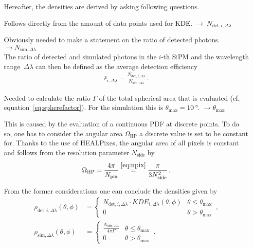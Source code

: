 Hereafter, the densities are derived by asking following questions.

Follows directly from the amount of data points used for KDE. $\rightarrow~N_{\text{det},i,\Delta\lambda}$

Obviously needed to make a statement on the ratio of detected photons. $\rightarrow N_{\text{sim},\Delta\lambda}$\\
The ratio of detected and simulated photons in the $i$-th SiPM and the wavelength range~$\Delta\lambda$ can then be defined as the average detection efficiency 
\begin{align}
	\bar{\epsilon}_{i,\Delta\lambda} = \frac{N_{\text{det},i,\Delta\lambda}}{N_{\text{sim},\Delta\lambda}}\,.
\end{align}

Needed to calculate the ratio $\Gamma$ of the total spherical area that is evaluated (cf. equation~\eqref{eq:spherefactor}). For the \iceact simulation this is $\theta_\text{max} = \SI{10}{\degree}$. $\rightarrow \theta_\text{max}$

This is caused by the evaluation of a continuous PDF at discrete points. To do so, one has to consider the angular area $\Omega_\text{HP}$ a discrete value is set to be constant for. Thanks to the use of HEALPixes, the angular area of all pixels is constant and follows from the resolution parameter $N_\text{side}$ by
\begin{align}
	\Omega_\text{HP} = \frac{4\pi}{N_\text{pix}} \overset{\eqref{eq:npix}}{=} \frac{\pi}{3N_\text{side}^2}\,.
	\label{eq:omega_hp}
\end{align}

From the former considerations one can conclude the densities given by
\begin{subequations}
	\begin{align}
		\rho_{\text{det},i,\Delta\lambda}(\theta,\phi) &= 
		\begin{cases}
			N_{\text{det},i,\Delta\lambda}\cdot KDE_{i,\Delta\lambda}(\theta,\phi) & \theta\leq\theta_\text{max}\\
			0 & \theta > \theta_\text{max}
		\end{cases}\,,
		\label{eq:rho_det}
		\\
		\rho_{\text{sim},\Delta\lambda}(\theta,\phi) &= 
		\begin{cases}
			\frac{N_{\text{sim},\Delta\lambda}}{4\pi\Gamma} & \theta\leq\theta_\text{max}\\
			0 & \theta > \theta_\text{max}
		\end{cases}\,.
		\label{eq:rho_sim}
	\end{align}
\end{subequations}

